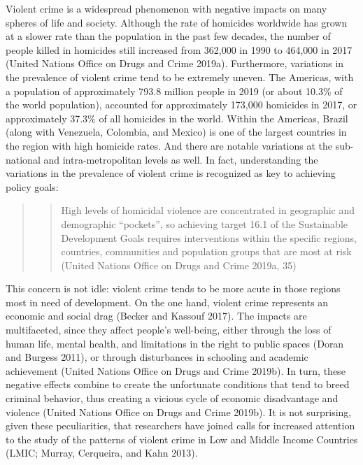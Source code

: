 \documentclass[smallextended]{svjour3}       %
\begin{document}
Violent crime is a widespread phenomenon with negative impacts on many
spheres of life and society. Although the rate of homicides worldwide
has grown at a slower rate than the population in the past few decades,
the number of people killed in homicides still increased from 362,000 in
1990 to 464,000 in 2017 (United Nations Office on Drugs and Crime
2019a). Furthermore, variations in the prevalence of violent crime tend
to be extremely uneven. The Americas, with a population of approximately
793.8 million people in 2019 (or about 10.3\% of the world population),
accounted for approximately 173,000 homicides in 2017, or approximately
37.3\% of all homicides in the world. Within the Americas, Brazil (along
with Venezuela, Colombia, and Mexico) is one of the largest countries in
the region with high homicide rates. And there are notable variations at
the sub-national and intra-metropolitan levels as well. In fact,
understanding the variations in the prevalence of violent crime is
recognized as key to achieving policy goals:

\begin{quote}
\begin{quote}
High levels of homicidal violence are concentrated in geographic and
demographic ``pockets'', so achieving target 16.1 of the Sustainable
Development Goals requires interventions within the specific regions,
countries, communities and population groups that are most at risk
(United Nations Office on Drugs and Crime 2019a, 35)
\end{quote}
\end{quote}

This concern is not idle: violent crime tends to be more acute in those
regions most in need of development. On the one hand, violent crime
represents an economic and social drag (Becker and Kassouf 2017). The
impacts are multifaceted, since they affect people's well-being, either
through the loss of human life, mental health, and limitations in the
right to public spaces (Doran and Burgess 2011), or through disturbances
in schooling and academic achievement (United Nations Office on Drugs
and Crime 2019b). In turn, these negative effects combine to create the
unfortunate conditions that tend to breed criminal behavior, thus
creating a vicious cycle of economic disadvantage and violence (United
Nations Office on Drugs and Crime 2019b). It is not surprising, given
these peculiarities, that researchers have joined calls for increased
attention to the study of the patterns of violent crime in Low and
Middle Income Countries (LMIC; Murray, Cerqueira, and Kahn 2013).
\end{document}
